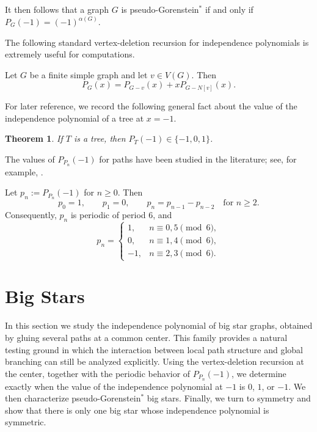 \documentclass[12pt]{amsart}
\theoremstyle{plain}
\newtheorem{thm}{Theorem}[section]
\theoremstyle{definition}
\begin{document}
It then follows that a graph \(G\) is pseudo-Gorenstein\(^{*}\) if and only if $P_G(-1)=(-1)^{\alpha(G)}$.


The following standard vertex-deletion recursion for independence polynomials is extremely useful for computations.

\begin{lem}\label{lem:delete_contract}
Let \(G\) be a finite simple graph and let \(v\in V(G)\). Then
\[
P_G(x)=P_{G-v}(x)+xP_{G-N[v]}(x).
\]
\end{lem}


For later reference, we record the following general fact about the value of the independence polynomial of a tree at $x=-1$.

\begin{thm}\cite[Theorem 2.4]{levit2009independence_preprint}\label{levit:tree_values}
If \(T\) is a tree, then $P_T(-1)\in\{-1,0,1\}$.
\end{thm}


The values of \(P_{P_n}(-1)\) for paths have been studied in the literature; see, for example, \cite{Kara_Vien_2026}.

\begin{lem}\label{lem:path-minus-one}
Let \(p_n:=P_{P_n}(-1)\) for \(n\ge 0\). Then
\[
p_0=1,\qquad p_1=0,\qquad p_n=p_{n-1}-p_{n-2}\quad \text{for } n\ge 2.
\]
Consequently, \(p_n\) is periodic of period \(6\), and
\[
p_n=
\begin{cases}
1,& n\equiv 0,5 \pmod 6,\\[4pt]
0,& n\equiv 1,4 \pmod 6,\\[4pt]
-1,& n\equiv 2,3 \pmod 6.
\end{cases}
\]
\end{lem}



\section{Big Stars}


In this section we study the independence polynomial of big star graphs, obtained by gluing several paths at a common center. This family provides a natural testing ground in which the interaction between local path structure and global branching can still be analyzed explicitly. Using the vertex-deletion recursion at the center, together with the periodic behavior of \(P_{P_n}(-1)\), we determine exactly when the value of the independence polynomial at \(-1\) is \(0\), \(1\), or \(-1\). We then characterize pseudo-Gorenstein\(^*\) big stars. Finally, we turn to symmetry and show that there is only one big star whose independence polynomial is symmetric.
\end{document}
